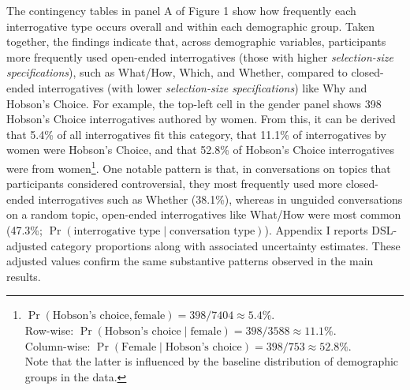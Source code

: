 \documentclass[
  12pt,
]{article}
\begin{document}
The contingency tables in panel A of Figure 1 show how frequently each interrogative type occurs overall and within each demographic group. Taken together, the findings indicate that, across demographic variables, participants more frequently used open-ended interrogatives (those with higher \emph{selection-size specifications}), such as What/How, Which, and Whether, compared to closed-ended interrogatives (with lower \emph{selection-size specifications}) like Why and Hobson's Choice. For example, the top-left cell in the gender panel shows 398 Hobson's Choice interrogatives authored by women. From this, it can be derived that 5.4\% of all interrogatives fit this category, that 11.1\% of interrogatives by women were Hobson's Choice, and that 52.8\% of Hobson's Choice interrogatives were from women\footnote{\(\Pr(\text{Hobson’s choice}, \text{female}) = 398 / 7404 \approx \mathbf{5.4\%}\).\\
  Row-wise: \(\Pr(\text{Hobson’s choice} \mid \text{female}) = 398 / 3588 \approx \mathbf{11.1\%}\).\\
  Column-wise: \(\Pr(\text{Female} \mid \text{Hobson’s choice}) = 398 / 753 \approx \mathbf{52.8\%}\).\\
  Note that the latter is influenced by the baseline distribution of demographic groups in the data.}. One notable pattern is that, in conversations on topics that participants considered controversial, they most frequently used more closed-ended interrogatives such as Whether (38.1\%), whereas in unguided conversations on a random topic, open-ended interrogatives like What/How were most common (47.3\%; \(\Pr(\text{interrogative type} \mid \text{conversation type})\)). Appendix I reports DSL-adjusted category proportions along with associated uncertainty estimates. These adjusted values confirm the same substantive patterns observed in the main results.
\end{document}
